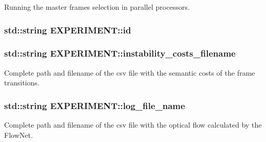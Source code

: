 Running the master frames selection in parallel processors. 

\subsubsection[{\texorpdfstring{id}{id}}]{\setlength{\rightskip}{0pt plus 5cm}std\+::string E\+X\+P\+E\+R\+I\+M\+E\+N\+T\+::id}\hypertarget{structEXPERIMENT_af59b6805fe0851b89d1300849db794e4}{}\label{structEXPERIMENT_af59b6805fe0851b89d1300849db794e4}
\subsubsection[{\texorpdfstring{instability\+\_\+costs\+\_\+filename}{instability\_costs\_filename}}]{\setlength{\rightskip}{0pt plus 5cm}std\+::string E\+X\+P\+E\+R\+I\+M\+E\+N\+T\+::instability\+\_\+costs\+\_\+filename}\hypertarget{structEXPERIMENT_a74bd001a4012183b8dacec4e79315a13}{}\label{structEXPERIMENT_a74bd001a4012183b8dacec4e79315a13}


Complete path and filename of the csv file with the semantic costs of the frame transitions. 

\subsubsection[{\texorpdfstring{log\+\_\+file\+\_\+name}{log\_file\_name}}]{\setlength{\rightskip}{0pt plus 5cm}std\+::string E\+X\+P\+E\+R\+I\+M\+E\+N\+T\+::log\+\_\+file\+\_\+name}\hypertarget{structEXPERIMENT_ac3568164588c0366d26fc9cd69b98fe3}{}\label{structEXPERIMENT_ac3568164588c0366d26fc9cd69b98fe3}


Complete path and filename of the csv file with the optical flow calculated by the Flow\+Net. 

